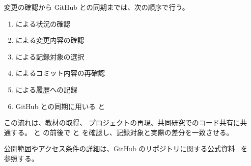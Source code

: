 変更の確認から GitHub との同期までは、次の順序で行う。

\begin{enumerate}
\item {} による状況の確認
\item {} による変更内容の確認
\item {} による記録対象の選択
\item {} によるコミット内容の再確認
\item {} による履歴への記録
\item GitHub との同期に用いる  と 
\end{enumerate}

この流れは、教材の取得、 プロジェクトの再現、共同研究でのコード共有に共通する。 と  の前後で  と  を確認し、記録対象と実際の差分を一致させる。

公開範囲やアクセス条件の詳細は、GitHub のリポジトリに関する公式資料~\cite{github_visibility} を参照する。
